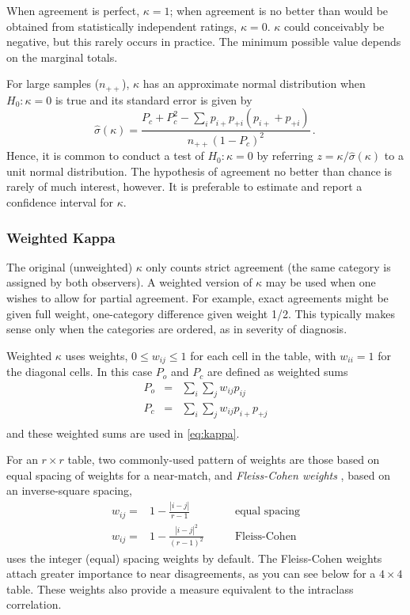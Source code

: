 When agreement is perfect, \(\kappa = 1\);  when agreement is no
better than would be obtained from statistically independent ratings,
$\kappa = 0$.
$\kappa$ could conceivably be negative, but this rarely occurs in practice.
The minimum possible value depends on the marginal totals.

For large samples ($n_{++}$), $\kappa$ has an approximate normal
distribution when $H_0 : \kappa = 0$ is true
and its standard error \citep{Fleiss:73,Fleiss-etal:69} is given by
\begin{equation*}
 \hat{\sigma}(\kappa) =  \frac{ P_c + P_c^2 - \sum_i p_{i+} p_{+i} (p_{i+} + p_{+i}) } { n_{++} (1 - P_c)^2 }
 \period
\end{equation*}
Hence, it is common to conduct a test of $H_0 : \kappa = 0$ by
referring $z = \kappa / \hat{\sigma}(\kappa)$
to a unit normal distribution.
The hypothesis of agreement no better than chance is rarely of much
interest, however.  It is preferable to estimate and report a
confidence interval for $\kappa$.

\subsubsection{Weighted Kappa}
The original (unweighted) \(\kappa\) only counts strict agreement (the same
 category is assigned by both observers).  A weighted version of
       \(\kappa\)
                 \citep{Cohen:68} may be used when one wishes to allow for partial agreement.
       For example, exact agreements might be given full weight,
       one-category difference given weight 1/2.  This typically makes sense
       only when the categories are ordered, as in severity of
       diagnosis.

Weighted \(\kappa\) uses weights, $0 \le w_{ij} \le 1$ for each cell in the
table, with $w_{ii} =1$ for the diagonal cells.
In this case $P_o$ and $P_c$ are defined as weighted sums
\begin{eqnarray*}
P_o  & = & \sum_i \sum_j w_{ij} p_{ij} \\
P_c  & = & \sum_i \sum_j w_{ij} p_{i+} p_{+j}\\
\end{eqnarray*}
and these weighted sums are used in \eqref{eq:kappa}.

For an $r \times r$ table, two commonly-used pattern of weights are those based on
equal spacing of weights
\citep{CicchettiAllison:71}
for a near-match,
and
\emph{Fleiss-Cohen weights}
\citep{FleissCohen:73}, based on an inverse-square
spacing,
\begin{eqnarray*}
w_{ij} = & 1 - \frac{|i-j|}{r-1} & \quad\quad\mbox{equal spacing} \\
w_{ij} = & 1 - \frac{|i-j|^2}{(r-1)^2} & \quad\quad\mbox{Fleiss-Cohen}
\end{eqnarray*}
 uses the integer (equal) spacing weights by default.
The Fleiss-Cohen weights attach greater importance
to near disagreements, as you can see below for a $4 \times 4$ table.
These weights also provide a measure equivalent to the intraclass
correlation.

